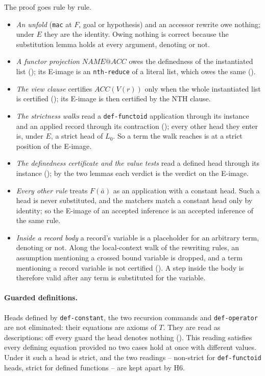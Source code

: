 The proof goes rule by rule.
\begin{itemize}
\item \emph{An unfold} (\texttt{mac} at $F$, goal or hypothesis) and an
  accessor rewrite owe nothing; under $E$ they are the identity.  Owing
  nothing is correct because the substitution lemma holds at every
  argument, denoting or not.
\item \emph{A functor projection} $\mathit{NAME}@\mathit{ACC}$ owes the
  definedness of the instantiated list (); its E-image is an
  \texttt{nth-reduce} of a literal list, which owes the same ().
\item \emph{The view clause} certifies $\mathit{ACC}(V(r))$ only when the
  whole instantiated list is certified (); its E-image is then
  certified by the NTH clause.
\item \emph{The strictness walks} read a \texttt{def-functoid} application
  through its instance and an applied record through its contraction
  (); every other head they enter is, under $E$, a strict head of
  $L_0$.  So a term the walk reaches is at a strict position of the
  E-image.
\item \emph{The definedness certificate and the value tests} read a
  defined head through its instance (); by the two lemmas each
  verdict is the verdict on the E-image.
\item \emph{Every other rule} treats $F(\bar a)$ as an application with a
  constant head.  Such a head is never substituted, and the matchers match
  a constant head only by identity; so the E-image of an accepted
  inference is an accepted inference of the same rule.
\item \emph{Inside a record body} a record's variable is a placeholder for
  an arbitrary term, denoting or not.  Along the local-context walk of the
  rewriting rules, an assumption mentioning a crossed bound variable is
  dropped, and a term mentioning a record variable is not certified
  ().  A step inside the body is therefore valid after any term is
  substituted for the variable.
\end{itemize}

\paragraph{Guarded definitions.}  Heads defined by \texttt{def-constant},
the two recursion commands and \texttt{def-operator} are not eliminated:
their equations are axioms of $T$.  They are read as descriptions: off
every guard the head denotes nothing ().  This reading satisfies
every defining equation provided no two cases hold at once with
different values.  Under it such a head is strict, and the two readings
-- non-strict for \texttt{def-functoid} heads, strict for defined
functions -- are kept apart by H6.

